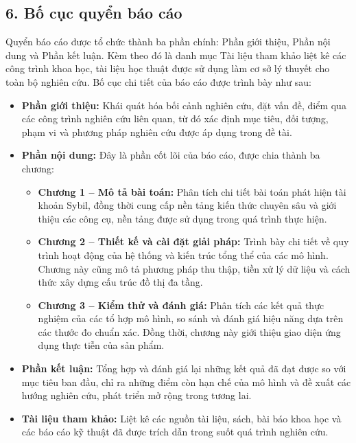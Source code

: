 \subsection{6. Bố cục quyển báo cáo}

\indent\indent Quyển báo cáo được tổ chức thành ba phần chính: Phần giới thiệu, Phần nội dung và Phần kết luận. Kèm theo đó là danh mục Tài liệu tham khảo liệt kê các công trình khoa học, tài liệu học thuật được sử dụng làm cơ sở lý thuyết cho toàn bộ nghiên cứu. Bố cục chi tiết của báo cáo được trình bày như sau:\vspace{-0.1cm}

\begin{itemize}[label={--}, itemsep=1pt]
    \item \textbf{Phần giới thiệu:} Khái quát hóa bối cảnh nghiên cứu, đặt vấn đề, điểm qua các công trình nghiên cứu liên quan, từ đó xác định mục tiêu, đối tượng, phạm vi và phương pháp nghiên cứu được áp dụng trong đề tài.
    \item \textbf{Phần nội dung:} Đây là phần cốt lõi của báo cáo, được chia thành ba chương:\vspace{-0.1cm} 
    \begin{itemize}[label={+}, itemsep=1pt]
        \item \textbf{Chương 1 -- Mô tả bài toán:} Phân tích chi tiết bài toán phát hiện tài khoản Sybil, đồng thời cung cấp nền tảng kiến thức chuyên sâu và giới thiệu các công cụ, nền tảng được sử dụng trong quá trình thực hiện.
        \item \textbf{Chương 2 -- Thiết kế và cài đặt giải pháp:} Trình bày chi tiết về quy trình hoạt động của hệ thống và kiến trúc tổng thể của các mô hình. Chương này cũng mô tả phương pháp thu thập, tiền xử lý dữ liệu và cách thức xây dựng cấu trúc đồ thị đa tầng.
        \item \textbf{Chương 3 -- Kiểm thử và đánh giá:} Phân tích các kết quả thực nghiệm của các tổ hợp mô hình, so sánh và đánh giá hiệu năng dựa trên các thước đo chuẩn xác. Đồng thời, chương này giới thiệu giao diện ứng dụng thực tiễn của sản phẩm.
    \end{itemize}
    \item \textbf{Phần kết luận:} Tổng hợp và đánh giá lại những kết quả đã đạt được so với mục tiêu ban đầu, chỉ ra những điểm còn hạn chế của mô hình và đề xuất các hướng nghiên cứu, phát triển mở rộng trong tương lai.
    \item \textbf{Tài liệu tham khảo:} Liệt kê các nguồn tài liệu, sách, bài báo khoa học và các báo cáo kỹ thuật đã được trích dẫn trong suốt quá trình nghiên cứu.
\end{itemize}